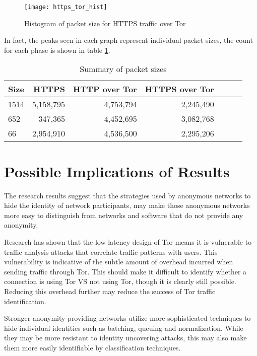 \begin{figure}[H]
  \centering\texttt{[image: https\_tor\_hist]}
  \caption{Histogram of packet size for HTTPS traffic over Tor}
  \label{https_tor_hist}
\end{figure}

In fact, the peaks seen in each graph represent individual packet sizes, the
count for each phase is shown in table \ref{table:packet_size_summary}.

\begin{table}[H]
  \begin{tabular}{lrrrrrr}
    \toprule
    Size & HTTPS & HTTP over Tor & HTTPS over Tor \\
    \midrule
    1514 & 5,158,795 & 4,753,794 & 2,245,490\\
    652 & 347,365 & 4,452,695 & 3,082,768\\
    66 & 2,954,910 & 4,536,500 & 2,295,206\\
    \bottomrule
  \end{tabular}
  \caption{Summary of packet sizes}
  \label{table:packet_size_summary}
\end{table}

\section{Possible Implications of Results}

The research results suggest that the strategies used by anonymous networks to
hide the identity of network participants, may make those anonymous networks
more easy to distinguish from networks and software that do not provide any
anonymity.

Research has shown that the low latency design of Tor means it is vulnerable to
traffic analysis attacks that correlate traffic patterns with users. This
vulnerability is indicative of the subtle amount of overhead incurred when
sending traffic through Tor. This should make it difficult to identify whether a
connection is using Tor VS not using Tor, though it is clearly still possible.
Reducing this overhead further may reduce the success of Tor traffic
identification.

Stronger anonymity providing networks utilize more sophisticated techniques to
hide individual identities such as batching, queuing and normalization. While
they may be more resistant to identity uncovering attacks, this may also make
them more easily identifiable by classification techniques.

